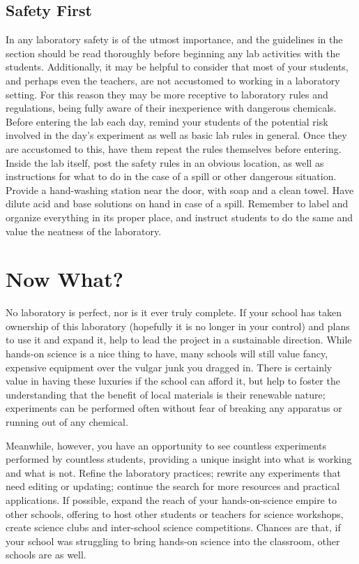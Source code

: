 \subsection{Safety First}
In any laboratory safety is of the utmost importance, and the guidelines in the  section should be read thoroughly before beginning any lab activities with the students.  Additionally, it may be helpful to consider that most of your students, and perhaps even the teachers, are not accustomed to working in a laboratory setting.  For this reason they may be more receptive to laboratory rules and regulations, being fully aware of their inexperience with dangerous chemicals.  Before entering the lab each day, remind your students of the potential risk involved in the day’s experiment as well as basic lab rules in general.  Once they are accustomed to this, have them repeat the rules themselves before entering.  Inside the lab itself, post the safety rules in an obvious location, as well as instructions for what to do in the case of a spill or other dangerous situation.  Provide a hand-washing station near the door, with soap and a clean towel.  Have dilute acid and base solutions on hand in case of a spill.  Remember to label and organize everything in its proper place, and instruct students to do the same and value the neatness of the laboratory.

\section{Now What?}
No laboratory is perfect, nor is it ever truly complete.  If your school has taken ownership of this laboratory (hopefully it is no longer in your control) and plans to use it and expand it, help to lead the project in a sustainable direction.  While hands-on science is a nice thing to have, many schools will still value fancy, expensive equipment over the vulgar junk you dragged in.  There is certainly value in having these luxuries if the school can afford it, but help to foster the understanding that the benefit of local materials is their renewable nature; experiments can be performed often without fear of breaking any apparatus or running out of any chemical.

Meanwhile, however, you have an opportunity to see countless experiments performed by countless students, providing a unique insight into what is working and what is not.  Refine the laboratory practices; rewrite any experiments that need editing or updating; continue the search for more resources and practical applications.  If possible, expand the reach of your hands-on-science empire to other schools, offering to host other students or teachers for science workshops, create science clubs and inter-school science competitions.  Chances are that, if your school was struggling to bring hands-on science into the classroom, other schools are as well.

